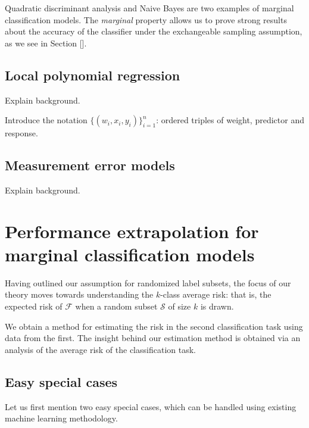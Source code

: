 \documentclass[12pt]{article}
\begin{document}
Quadratic discriminant analysis and Naive Bayes are two examples of
marginal classification models.
The \emph{marginal} property allows us to prove strong results about
the accuracy of the classifier under the exchangeable sampling
assumption, as we see in Section [].

\subsection{Local polynomial regression}

Explain background.

Introduce the notation $\{(w_i, x_i, y_i)\}_{i=1}^n$: ordered triples
of weight, predictor and response.

\subsection{Measurement error models}

Explain background.

\section{Performance extrapolation for marginal classification models}

Having outlined our assumption for randomized label subsets, the focus
of our theory moves towards understanding the $k$-class average risk:
that is, the expected risk of $\mathcal{F}$ when a random subset
$\mathcal{S}$ of size $k$ is drawn.

We obtain a method for estimating the risk in the second
classification task using data from the first.  The insight behind our
estimation method is obtained via an analysis of the average risk of
the classification task.

\subsection{Easy special cases}

Let us first mention two easy special cases, which can be handled
using existing machine learning methodology.
\end{document}
